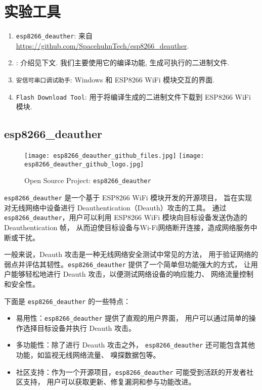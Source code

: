 \documentclass[../main.tex]{subfiles}
\begin{document}
\section{实验工具}
\begin{enumerate}
  \item \texttt{esp8266\_deauther}: 来自
    \url{https://github.com/SpacehuhnTech/esp8266_deauther}.
  \item {}: 介绍见下文. 我们主要使用它的编译功能,
    生成可执行的二进制文件.
  \item \texttt{安信可串口调试助手}: Windows 和 ESP8266 WiFi 模块交互的界面.
  \item \texttt{Flash Download Tool}: 用于将编译生成的二进制文件下载到 ESP8266
    WiFi 模块.
\end{enumerate}
%
\subsection{esp8266\_deauther}
\begin{figure}[H]
  \begin{center}
    \texttt{[image: esp8266\_deauther\_github\_files.jpg]}
    \texttt{[image: esp8266\_deauther\_github\_logo.jpg]}
  \end{center}
  \caption{Open Source Project: \texttt{esp8266\_deauther}}
\end{figure}
%
\texttt{esp8266\_deauther} 是一个基于 ESP8266 WiFi 模块开发的开源项目，
旨在实现对无线网络中设备进行 Deauthentication（Deauth）攻击的工具。
通过 \texttt{esp8266\_deauther}，用户可以利用 ESP8266 WiFi 模块向目标设备发送伪造的 Deauthentication 帧，
从而迫使目标设备与Wi-Fi网络断开连接，造成网络服务中断或干扰。

一般来说，Deauth 攻击是一种无线网络安全测试中常见的方法，
用于验证网络的弱点并评估其韧性。\texttt{esp8266\_deauther} 提供了一个简单但功能强大的方式，
让用户能够轻松地进行 Deauth 攻击，以便测试网络设备的响应能力、
网络流量控制和安全性。

下面是 \texttt{esp8266\_deauther} 的一些特点：
\begin{itemize}
  \item 易用性：\texttt{esp8266\_deauther} 提供了直观的用户界面，
    用户可以通过简单的操作选择目标设备并执行 Deauth 攻击。
  \item 多功能性：除了进行 Deauth 攻击之外，
    \texttt{esp8266\_deauther} 还可能包含其他功能，如监视无线网络流量、
    嗅探数据包等。
  \item 社区支持：作为一个开源项目，\texttt{esp8266\_deauther} 可能受到活跃的开发者社区支持，
    用户可以获取更新、修复漏洞和参与功能改进。
\end{itemize}
%
\end{document}
